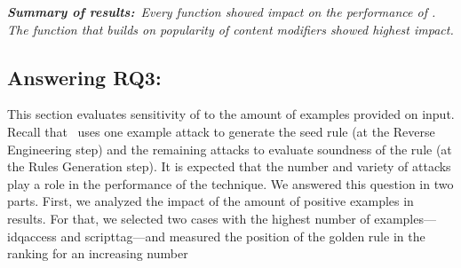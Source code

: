 \documentclass[conference]{IEEEtran}
\begin{document}
\emph{\textbf{Summary of results:}~Every function showed impact on the
  performance of \tname. The function that builds on popularity of
  content modifiers showed highest impact.}


\subsection{Answering RQ3: \textRQthree}
\label{sec:answer-rqthree}

This section evaluates sensitivity of \tname{} to the amount of
examples provided on input. Recall that \tname\ uses one example
attack to generate the seed rule (at the Reverse Engineering step) and
the remaining attacks to evaluate soundness of the rule (at the Rules
Generation step). It is expected that the number and variety of attacks
play a role in the performance of the technique.  We answered this
question in two parts. First, we analyzed the impact of the amount of
positive examples in results. For that, we selected two cases with the
highest number of examples---idqaccess and scripttag---and measured
the position of the golden rule in the ranking for an increasing number
\end{document}
